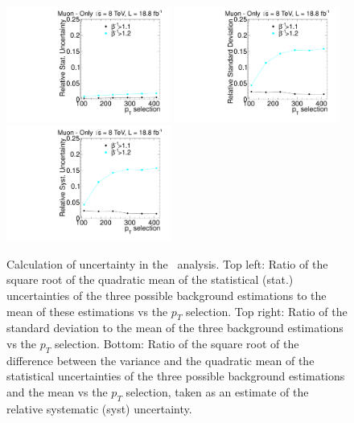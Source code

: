\begin{figure}
\begin{center}
\includegraphics[clip=false, trim=0.0cm 0cm 0.0cm 0cm, width=0.48\textwidth]{figures/muonly/Data8TeVCollisionStat}
\includegraphics[clip=false, trim=0.0cm 0cm 0.0cm 0cm, width=0.48\textwidth]{figures/muonly/Data8TeVCollisionStatSyst} \\
\includegraphics[clip=false, trim=0.0cm 0cm 0.0cm 0cm, width=0.48\textwidth]{figures/muonly/Data8TeVCollisionSyst}
\caption[Statistical and systematic uncertainties in the background prediction for different sets of thresholds in the \muononly\ analysis.]
{Calculation of uncertainty in the \muononly\ analysis.
Top left: Ratio of the square root of the quadratic
mean of the statistical (stat.) uncertainties of the three possible background
estimations to the mean of these estimations vs
the $p_T$ selection. Top right: Ratio of the standard deviation to the mean of the three
background estimations vs the $p_T$ selection. Bottom: Ratio of the
square root of the difference between the variance and the quadratic
mean of the statistical uncertainties of the three possible background
estimations and the mean vs the $p_T$ selection, taken as an estimate of the relative systematic (syst) uncertainty.
}
\label{fig:MuOnlyUnc}
\end{center}
\end{figure}

